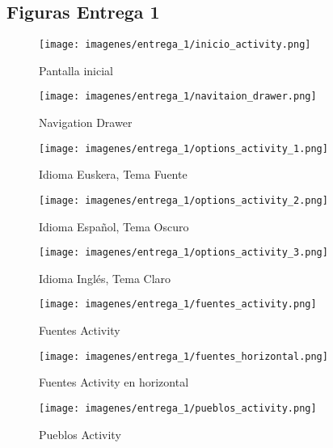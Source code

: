 \documentclass[11pt,a4paper]{article}
\begin{document}
\newpage

\subsection{Figuras Entrega 1}
\begin{figure}[H]
    \centering
    \texttt{[image: imagenes/entrega\_1/inicio\_activity.png]}
    \caption{Pantalla inicial}
    \label{inicio}
\end{figure}
\begin{figure}[H]
    \centering
    \texttt{[image: imagenes/entrega\_1/navitaion\_drawer.png]}
    \caption{Navigation Drawer}
    \label{nav_drawer}
\end{figure}

\begin{figure}[H]
    \centering
    \texttt{[image: imagenes/entrega\_1/options\_activity\_1.png]}
    \caption{Idioma Euskera, Tema Fuente}
    \label{opt1}
\end{figure}
\begin{figure}[H]
    \centering
    \texttt{[image: imagenes/entrega\_1/options\_activity\_2.png]}
    \caption{Idioma Español, Tema Oscuro}
    \label{opt2}
\end{figure}
\begin{figure}[H]
    \centering
    \texttt{[image: imagenes/entrega\_1/options\_activity\_3.png]}
    \caption{Idioma Inglés, Tema Claro}
    \label{opt3}
\end{figure}

\begin{figure}[H]
    \centering
    \texttt{[image: imagenes/entrega\_1/fuentes\_activity.png]}
    \caption{Fuentes Activity}
    \label{fuentes}
\end{figure}
\begin{figure}[H]
    \centering
    \texttt{[image: imagenes/entrega\_1/fuentes\_horizontal.png]}
    \caption{Fuentes Activity en horizontal}
    \label{fuentes_hori}
\end{figure}
\begin{figure}[H]
    \centering
    \texttt{[image: imagenes/entrega\_1/pueblos\_activity.png]}
    \caption{Pueblos Activity}
    \label{municipios}
\end{figure}
\end{document}
